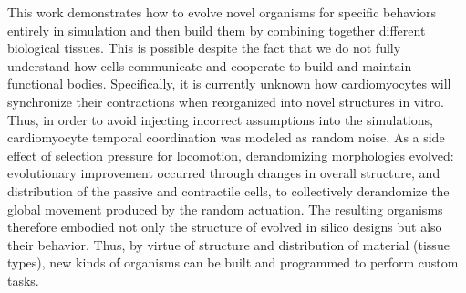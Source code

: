 This work demonstrates how to evolve novel organisms for specific behaviors entirely in simulation and then build them 
by combining together different biological tissues.
This is possible despite the fact that we do not fully understand how cells communicate and cooperate to build and maintain functional bodies.
Specifically,
it is currently unknown how cardiomyocytes will synchronize their contractions when reorganized into novel structures in vitro.
Thus, in order to avoid injecting incorrect assumptions into the simulations,
cardiomyocyte temporal coordination was modeled as random noise.
As a side effect of selection pressure for locomotion, derandomizing morphologies evolved: evolutionary improvement occurred through changes in overall structure, and distribution of the passive and contractile cells, to collectively derandomize the global movement produced by the random actuation. 
The resulting organisms therefore embodied not only the structure of evolved in silico designs but also their behavior.
Thus, by virtue of structure and distribution of material (tissue types), new kinds of organisms can be built and programmed to perform custom tasks.










